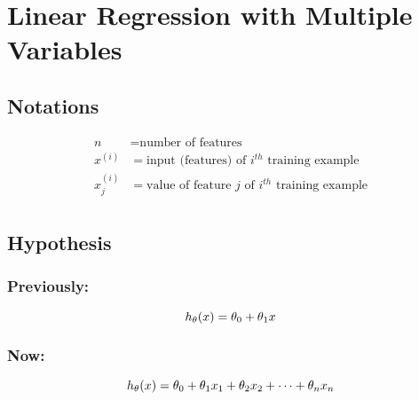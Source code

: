 \chapter{Linear Regression with Multiple Variables}

\section{Notations}
\begin{align*}
    n         & = \text{number of features}                                \\
    x^{(i)}   & = \text{input (features) of $i^{th}$ training example}     \\
    x_j^{(i)} & = \text{value of feature $j$ of $i^{th}$ training example} \\
\end{align*}

\section{Hypothesis}
\subsection*{Previously:}
\begin{equation*}
    h_\theta(x) = \theta_0 + \theta_1x\\
\end{equation*}
\subsection*{Now:}
\begin{equation*}
    h_\theta(x) = \theta_0	+ \theta_1x_1 + \theta_2x_2 + \dots + \theta_nx_n\\
\end{equation*}

